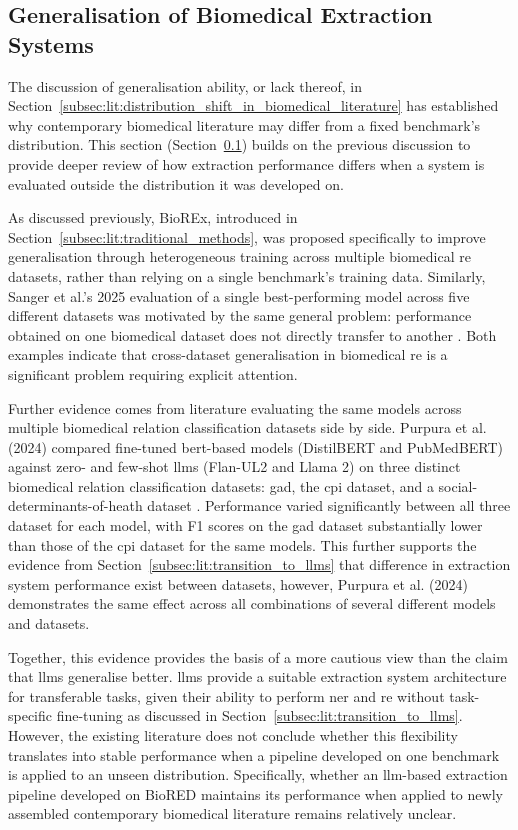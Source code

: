 \subsection{Generalisation of Biomedical Extraction Systems}
\label{subsec:lit:generalisation_of_biomedical_extraction_systems}
The discussion of generalisation ability, or lack thereof, in Section~\ref{subsec:lit:distribution_shift_in_biomedical_literature} has established why contemporary biomedical literature may differ from a fixed benchmark's distribution. This section (Section~\ref{subsec:lit:generalisation_of_biomedical_extraction_systems}) builds on the previous discussion to provide deeper review of how extraction performance differs when a system is evaluated outside the distribution it was developed on.

As discussed previously, BioREx, introduced in Section~\ref{subsec:lit:traditional_methods}, was proposed specifically to improve generalisation through heterogeneous training across multiple biomedical \gls{re} datasets, rather than relying on a single benchmark's training data. Similarly, Sanger et al.'s 2025 evaluation of a single best-performing model across five different datasets was motivated by the same general problem: performance obtained on one biomedical dataset does not directly transfer to another \cite{sanger2025_fixed_dataset_eval_2}. Both examples indicate that cross-dataset generalisation in biomedical \gls{re} is a significant problem requiring explicit attention.

Further evidence comes from literature evaluating the same models across multiple biomedical relation classification datasets side by side. Purpura et al. (2024) compared fine-tuned \gls{bert}-based models (DistilBERT and PubMedBERT) against zero- and few-shot \glspl{llm} (Flan-UL2 and Llama 2) on three distinct biomedical relation classification datasets: \gls{gad}, the \gls{cpi} dataset, and a social-determinants-of-heath dataset \cite{purpura2024investigating}. Performance varied significantly between all three dataset for each model, with F1 scores on the \gls{gad} dataset substantially lower than those of the \gls{cpi} dataset for the same models. This further supports the evidence from Section~\ref{subsec:lit:transition_to_llms} that difference in extraction system performance exist between datasets, however, Purpura et al. (2024) demonstrates the same effect across all combinations of several different models and datasets.

Together, this evidence provides the basis of a more cautious view than the claim that \glspl{llm} generalise better. \glspl{llm} provide a suitable extraction system architecture for transferable tasks, given their ability to perform \gls{ner} and \gls{re} without task-specific fine-tuning as discussed in Section~\ref{subsec:lit:transition_to_llms}. However, the existing literature does not conclude whether this flexibility translates into stable performance when a pipeline developed on one benchmark is applied to an unseen distribution. Specifically, whether an \gls{llm}-based extraction pipeline developed on BioRED maintains its performance when applied to newly assembled contemporary biomedical literature remains relatively unclear.


